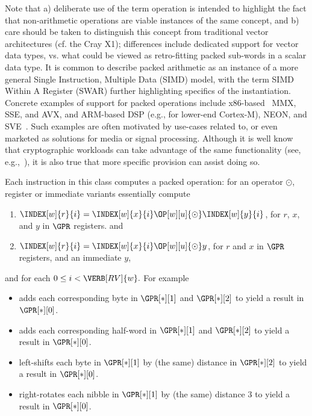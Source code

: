 \noindent
Note that
a) deliberate use of the term operation is intended to highlight the fact 
   that non-arithmetic operations are viable instances of the same concept,
   and
b) care should be taken to distinguish this concept from traditional vector 
   architectures
   (cf. the Cray X1);
   differences include dedicated support for vector data types, vs. what
   could be viewed as retro-fitting packed sub-words in a scalar data type.
It is common to describe packed arithmetic as an instance of a more general
Single Instruction, Multiple Data (SIMD) model, with the term SIMD Within 
A Register (SWAR) further highlighting specifics of the instantiation.
Concrete examples of support for packed operations include
x86-based~\cite[Section 2.2.7]{SCARV:X86:2:18} MMX, SSE, and AVX,
and
ARM-based DSP (e.g., for lower-end Cortex-M), NEON, and SVE~\cite{SCARV:SBBEEGHMMPRRW:17}.
Such examples are often motivated by use-cases related to, or even marketed 
as solutions for media or signal processing.  Although it is well know that
cryptographic workloads can take advantage of the same functionality
(see, e.g.,~\cite{SCARV:Hamburg:09,SCARV:BerSch:12}),
it is also true that more specific provision can assist doing so.  

Each instruction in this class 
computes a packed operation: for an operator $\odot$, register or immediate 
variants essentially compute

\begin{enumerate}
\item $\INDEX[w]{r}{i} = \INDEX[w]{x}{i} \OP[w][u]{\odot} \INDEX[w]{y}{i}$,
      for $r$, $x$, and $y$ in $\GPR$ registers.
      and
\item $\INDEX[w]{r}{i} = \INDEX[w]{x}{i} \OP[w][u]{\odot}           y    $,
      for $r$       and $x$ in $\GPR$ registers, and an immediate $y$,
\end{enumerate}

\noindent
and for each 
$
0 \leq i < \VERB[RV]{w} .
$ 
For example

\begin{itemize}
\item {}
      adds 
      each corresponding 
           byte 
      in
      $\GPR[*][1]$
      and
      $\GPR[*][2]$
      to yield a result in
      $\GPR[*][0]$.

\item {} 
      adds
      each corresponding 
      half-word
      in
      $\GPR[*][1]$
      and
      $\GPR[*][2]$
      to yield a result in
      $\GPR[*][0]$.

\item {} 
      left-shifts 
      each
           byte
      in
      $\GPR[*][1]$
      by (the same) distance in
      $\GPR[*][2]$
      to yield a result in
      $\GPR[*][0]$.

\item {} 
      right-rotates
      each
           nibble
      in
      $\GPR[*][1]$
      by (the same) distance
      $3$
      to yield a result in
      $\GPR[*][0]$.
\end{itemize}

